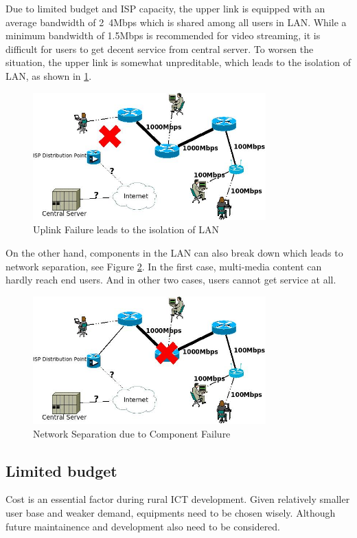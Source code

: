 Due to limited budget and ISP capacity, the upper link is equipped with an average bandwidth of 2~4Mbps which is shared among all users in LAN. While a minimum bandwidth of 1.5Mbps is recommended for video streaming, it is difficult for users to get decent service from central server.
To worsen the situation, the upper link is somewhat unpreditable, which leads to the isolation of LAN, as shown in \ref{uplink_break}.

\begin{figure}
\centering
\includegraphics[width=0.8\textwidth]{../images/brief_diagram_of_sbn_network_upper_broken.jpeg}
\caption{Uplink Failure leads to the isolation of LAN}
\label{uplink_break}
\end{figure}

On the other hand, components in the LAN can also break down which leads to network separation, see Figure \ref{nata_break}. In the first case, multi-media content can hardly reach end users. And in other two cases, users cannot get service at all.

\begin{figure}
\centering
\includegraphics[width=0.8\textwidth]{../images/brief_diagram_of_sbn_network_nata_broken.jpeg}
\caption{Network Separation due to Component Failure}
\label{nata_break}
\end{figure}

\subsection{Limited budget}
Cost is an essential factor during rural ICT development. Given relatively smaller user base and weaker demand, equipments need to be chosen wisely. Although future maintainence and development also need to be considered.